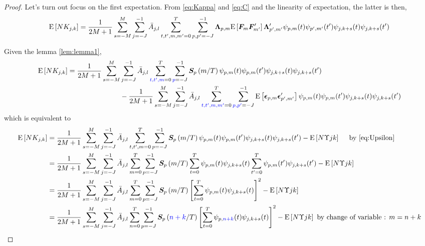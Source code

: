 \documentclass[main_document.tex]{subfiles}
\begin{document}
	\begin{proof}
		Let's turn out focus on the first expectation. From \eqref{eq:Kappa} and \eqref{eq:C} and the linearity of expectation, the latter is then, 
		\begin{align*}
			\E{N K_{j,k}} = \frac{\displaystyle 1}{\displaystyle 2M+1}\sum_{s=-M}^{M} \scalesum{j} \invA{j}{l} \locsum{t,t',m,m'} \scalesum{p,p'} \loadings{p}{m} \E{\factors{m}\factors{m'}'} \loadings{p'}{m'}' \wavelet{p}{m}{t}\wavelet{p'}{m'}{t'}\wavelet{j}{k+s}{t}\wavelet{j}{k+s}{t'}
		\end{align*}
		
		Given the lemma \ref{lem:lemma1}, 
		\begin{align*}
			\E{N K_{j,k}} = \frac{\displaystyle 1}{\displaystyle 2M+1}\sum_{s=-M}^{M}& \scalesum{j} \invA{j}{l} \locsum{\textcolor{blue}{t,t',m}} \scalesum{\textcolor{blue}{p}} \CEWS{p}{m}\wavelet{p}{m}{t}\wavelet{p}{m}{t'}\wavelet{j}{k+s}{t}\wavelet{j}{k+s}{t'} \\ 
			&- \frac{\displaystyle 1}{\displaystyle 2M+1}\sum_{s=-M}^{M} \scalesum{j} \invA{j}{l} \locsum{\textcolor{blue}{t,t',m,m'}} \scalesum{\textcolor{blue}{p,p'}} \E{\idioError{p}{m}\idioError{p'}{m'}'}\wavelet{p}{m}{t}\wavelet{p}{m}{t'}\wavelet{j}{k+s}{t}\wavelet{j}{k+s}{t'}
		\end{align*}
		which is equivalent to
		\begin{align*}
				\E{N K_{j,k}} &= \frac{\displaystyle 1}{\displaystyle 2M+1}\sum_{s=-M}^{M} \scalesum{j} \invA{j}{l} \locsum{t,t',m} \scalesum{p} \CEWS{p}{m}\wavelet{p}{m}{t}\wavelet{p}{m}{t'}\wavelet{j}{k+s}{t}\wavelet{j}{k+s}{t'} - \E{N\Upsilon{j}{k}} \quad \text{ by } \eqref{eq:Upsilon} \\
							&= \frac{\displaystyle 1}{\displaystyle 2M+1}\sum_{s=-M}^{M} \scalesum{j} \invA{j}{l} \locsum{m} \scalesum{p} \CEWS{p}{m} \locsum{t}\wavelet{p}{m}{t}\wavelet{j}{k+s}{t}\locsum{t'}\wavelet{p}{m}{t'}\wavelet{j}{k+s}{t'} - \E{N\Upsilon{j}{k}} \\
							&= \frac{\displaystyle 1}{\displaystyle 2M+1}\sum_{s=-M}^{M} \scalesum{j} \invA{j}{l} \locsum{m} \scalesum{p} \CEWS{p}{m} \left[\locsum{t}\wavelet{p}{m}{t}\wavelet{j}{k+s}{t}\right]^{2} - \E{N\Upsilon{j}{k}}\\
							&= \frac{\displaystyle 1}{\displaystyle 2M+1}\sum_{s=-M}^{M} \scalesum{j} \invA{j}{l} \locsum{n} \scalesum{p} \CEWS{p}{\textcolor{blue}{n+k}} \left[\locsum{t}\wavelet{p}{\textcolor{blue}{n+k}}{t}\wavelet{j}{k+s}{t}\right]^{2} - \E{N\Upsilon{j}{k}}  \text{ by change of variable : } m=n+k \\

\end{align*}
\end{proof}
\end{document}
